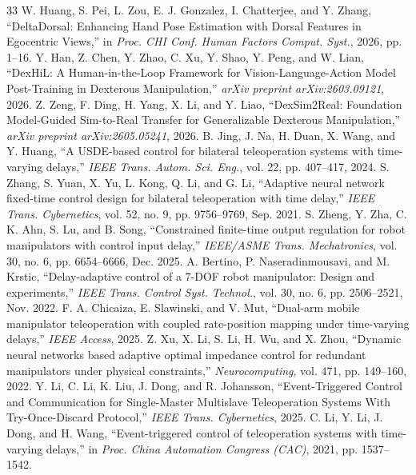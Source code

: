 \documentclass[letterpaper,journal]{IEEEtran}
\begin{document}
\begin{thebibliography}{33}
W. Huang, S. Pei, L. Zou, E. J. Gonzalez, I. Chatterjee, and Y. Zhang, ``DeltaDorsal: Enhancing Hand Pose Estimation with Dorsal Features in Egocentric Views,'' in \textit{Proc. CHI Conf. Human Factors Comput. Syst.}, 2026, pp. 1--16.
Y. Han, Z. Chen, Y. Zhao, C. Xu, Y. Shao, Y. Peng, and W. Lian, ``DexHiL: A Human-in-the-Loop Framework for Vision-Language-Action Model Post-Training in Dexterous Manipulation,'' \textit{arXiv preprint arXiv:2603.09121}, 2026.
Z. Zeng, F. Ding, H. Yang, X. Li, and Y. Liao, ``DexSim2Real: Foundation Model-Guided Sim-to-Real Transfer for Generalizable Dexterous Manipulation,'' \textit{arXiv preprint arXiv:2605.05241}, 2026.
B. Jing, J. Na, H. Duan, X. Wang, and Y. Huang, ``A USDE-based control for bilateral teleoperation systems with time-varying delays,'' \textit{IEEE Trans. Autom. Sci. Eng.}, vol. 22, pp. 407--417, 2024.
S. Zhang, S. Yuan, X. Yu, L. Kong, Q. Li, and G. Li, ``Adaptive neural network fixed-time control design for bilateral teleoperation with time delay,'' \textit{IEEE Trans. Cybernetics}, vol. 52, no. 9, pp. 9756--9769, Sep. 2021.
S. Zheng, Y. Zha, C. K. Ahn, S. Lu, and B. Song, ``Constrained finite-time output regulation for robot manipulators with control input delay,'' \textit{IEEE/ASME Trans. Mechatronics}, vol. 30, no. 6, pp. 6654--6666, Dec. 2025.
A. Bertino, P. Naseradinmousavi, and M. Krstic, ``Delay-adaptive control of a 7-DOF robot manipulator: Design and experiments,'' \textit{IEEE Trans. Control Syst. Technol.}, vol. 30, no. 6, pp. 2506--2521, Nov. 2022.
F. A. Chicaiza, E. Slawinski, and V. Mut, ``Dual-arm mobile manipulator teleoperation with coupled rate-position mapping under time-varying delays,'' \textit{IEEE Access}, 2025.
Z. Xu, X. Li, S. Li, H. Wu, and X. Zhou, ``Dynamic neural networks based adaptive optimal impedance control for redundant manipulators under physical constraints,'' \textit{Neurocomputing}, vol. 471, pp. 149--160, 2022.
Y. Li, C. Li, K. Liu, J. Dong, and R. Johansson, ``Event-Triggered Control and Communication for Single-Master Multislave Teleoperation Systems With Try-Once-Discard Protocol,'' \textit{IEEE Trans. Cybernetics}, 2025.
C. Li, Y. Li, J. Dong, and H. Wang, ``Event-triggered control of teleoperation systems with time-varying delays,'' in \textit{Proc. China Automation Congress (CAC)}, 2021, pp. 1537--1542.

\end{thebibliography}
\end{document}
